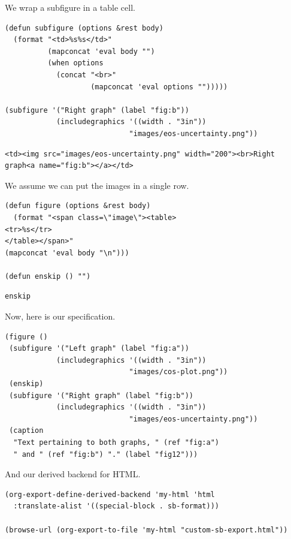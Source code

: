 \documentclass[11pt]{article}
\begin{document}
We wrap a subfigure in a table cell.
\begin{verbatim}
(defun subfigure (options &rest body)
  (format "<td>%s%s</td>"
          (mapconcat 'eval body "")
          (when options
            (concat "<br>"
                    (mapconcat 'eval options "")))))

(subfigure '("Right graph" (label "fig:b"))
            (includegraphics '((width . "3in"))
                             "images/eos-uncertainty.png"))
\end{verbatim}

\begin{verbatim}
<td><img src="images/eos-uncertainty.png" width="200"><br>Right graph<a name="fig:b"></a></td>
\end{verbatim}

We assume we can put the images in a single row.

\begin{verbatim}
(defun figure (options &rest body)
  (format "<span class=\"image\"><table>
<tr>%s</tr>
</table></span>"
(mapconcat 'eval body "\n")))

(defun enskip () "")
\end{verbatim}

\begin{verbatim}
enskip
\end{verbatim}

Now, here is our specification.
\begin{verbatim}
(figure ()
 (subfigure '("Left graph" (label "fig:a"))
            (includegraphics '((width . "3in"))
                             "images/cos-plot.png"))
 (enskip)
 (subfigure '("Right graph" (label "fig:b"))
            (includegraphics '((width . "3in"))
                             "images/eos-uncertainty.png"))
 (caption
  "Text pertaining to both graphs, " (ref "fig:a")
  " and " (ref "fig:b") "." (label "fig12")))
\end{verbatim}

And our derived backend for HTML.
\begin{verbatim}
(org-export-define-derived-backend 'my-html 'html
  :translate-alist '((special-block . sb-format)))

(browse-url (org-export-to-file 'my-html "custom-sb-export.html"))
\end{verbatim}
\end{document}
